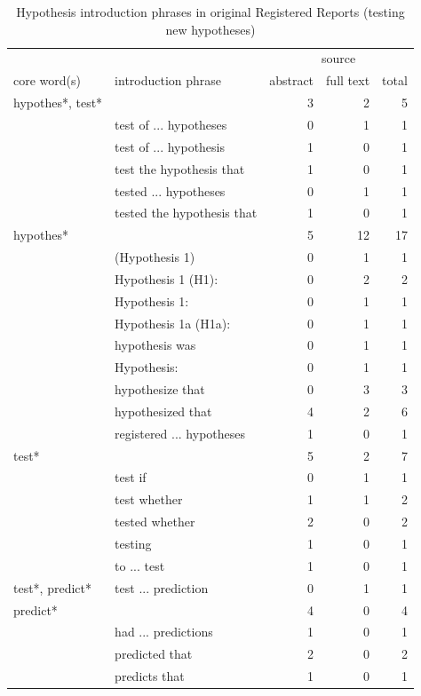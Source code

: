 \documentclass[british,,man,floatsintext]{apa6}
\begin{document}
\begin{table}[tbp]
\begin{center}
\begin{threeparttable}
\caption{\label{tab:unnamed-chunk-9}Hypothesis introduction phrases in original Registered Reports (testing new hypotheses)}
\footnotesize{
\begin{tabular}{llrrr}
\toprule
 &  & \multicolumn{3}{c}{source} \\
\cmidrule(r){3-5}
core word(s) & introduction phrase & abstract & full text & total\\
\midrule
hypothes*, test* &  & 3 & 2 & 5\\
 & test of ... hypotheses & 0 & 1 & 1\\
 & test of ... hypothesis & 1 & 0 & 1\\
 & test the hypothesis that & 1 & 0 & 1\\
 & tested ... hypotheses & 0 & 1 & 1\\
 & tested the hypothesis that & 1 & 0 & 1\\ \midrule
hypothes* &  & 5 & 12 & 17\\
 & (Hypothesis 1) & 0 & 1 & 1\\
 & Hypothesis 1 (H1): & 0 & 2 & 2\\
 & Hypothesis 1: & 0 & 1 & 1\\
 & Hypothesis 1a (H1a): & 0 & 1 & 1\\
 & hypothesis was & 0 & 1 & 1\\
 & Hypothesis: & 0 & 1 & 1\\
 & hypothesize that & 0 & 3 & 3\\
 & hypothesized that & 4 & 2 & 6\\
 & registered ... hypotheses & 1 & 0 & 1\\ \midrule
test* &  & 5 & 2 & 7\\
 & test if & 0 & 1 & 1\\
 & test whether & 1 & 1 & 2\\
 & tested whether & 2 & 0 & 2\\
 & testing & 1 & 0 & 1\\
 & to ... test & 1 & 0 & 1\\ \midrule
test*, predict* & test ... prediction & 0 & 1 & 1\\ \midrule
predict* &  & 4 & 0 & 4\\
 & had ... predictions & 1 & 0 & 1\\
 & predicted that & 2 & 0 & 2\\
 & predicts that & 1 & 0 & 1\\ \midrule

\end{tabular}}
\end{threeparttable}
\end{center}
\end{table}
\end{document}

